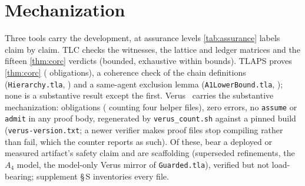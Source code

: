 \section{Mechanization}
\label{sec:mechanization}

Three tools carry the development, at assurance levels \cref{tab:assurance}
labels claim by claim. TLC checks the witnesses, the lattice and ledger
matrices and the fifteen \cref{thm:corc} verdicts (bounded, exhaustive
within bounds). TLAPS proves \cref{thm:corc} (\TlapsCommitOrder{} obligations), a
coherence check of the chain definitions (\texttt{Hierarchy.tla},
\TlapsHierarchy{}) and a same-agent exclusion lemma
(\texttt{A1LowerBound.tla}, \TlapsLowerBound{}); none is a substantive result
except the first. Verus~\cite{Lattuada2023Verus} carries the substantive
mechanization: \VerusCurated{} obligations (\VerusFull{} counting four helper
files), zero errors, no \texttt{assume} or \texttt{admit} in any proof body,
regenerated by \texttt{verus\_count.sh} against a pinned build
(\texttt{verus-version.txt}; a newer verifier makes proof files stop
compiling rather than fail, which the counter reports as such).
Of these, \VerusLoadBearing{} bear a deployed or measured artifact's
safety claim and \VerusScaffold{} are scaffolding (superseded refinements,
the $A_4$ model, the model-only Verus mirror of \texttt{Guarded.tla}),
verified but not load-bearing; supplement \S\,S inventories every file.



